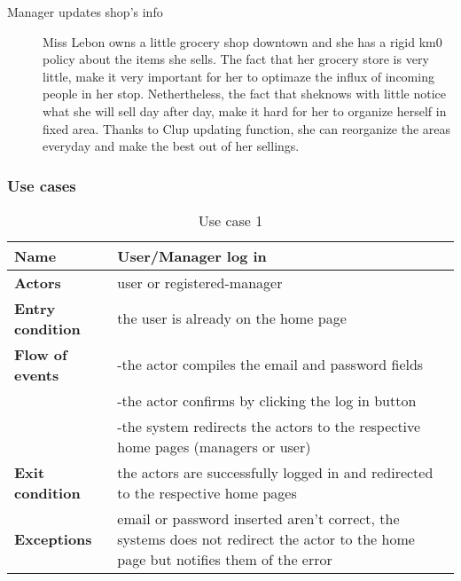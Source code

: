 \begin{description}
    \item[Manager updates shop's info]
    Miss Lebon owns a little grocery shop downtown and she has a rigid km0 policy about the items she sells. The fact that her grocery store is very little, make it very important for her to optimaze the influx of incoming people in her stop. Nethertheless, the fact that sheknows with little notice what she will sell day after day, make it hard for her to organize herself in fixed area. Thanks to Clup updating function, she can reorganize the areas everyday and make the best out of her sellings.
\end{description}


\subsubsection{Use cases}
\label{subsubsect:usecases} 

\begin{table}[h!]
    \centering
    \begin{tabular}{@{}P{0.2\textwidth}P{0.70\textwidth}@{}}
        \toprule
        \textbf{Name}                 & User/Manager log in\\
        \midrule
        \textbf{Actors}               & user or registered-manager\\
        \textbf{Entry condition}      & the user is already on the home page\\
        \textbf{Flow of events}            
        & -the actor compiles the email and password fields \\
        & -the actor confirms by clicking the log in button\\
        & -the system redirects the actors to the respective home pages (managers or user)\\
        \textbf{Exit condition}       & the actors are successfully logged in and redirected to the respective home pages\\
        \textbf{Exceptions}           & email or password inserted aren’t correct, the systems does not redirect the actor to the home page but notifies them of the error\\
        \bottomrule
    \end{tabular}
\caption{Use case 1}
\label{table:usecase1}
\end{table}

